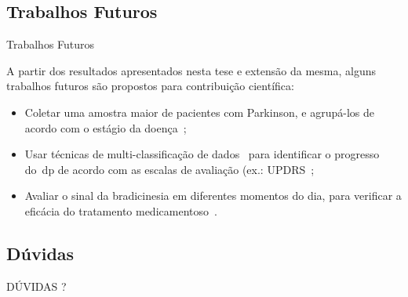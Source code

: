 \documentclass{beamer}
\begin{document}
\subsection{Trabalhos Futuros}
\begin{frame}{Trabalhos Futuros}
\begin{block}{}
A partir dos resultados apresentados nesta tese e extensão da mesma, alguns trabalhos futuros são propostos para contribuição científica:
  \begin{itemize}
   \item Coletar uma amostra maior de pacientes com Parkinson, e agrupá-los de acordo com o estágio da doença~\cite{goul05};
   \item Usar técnicas de multi-classificação de dados~\cite{multisvm2011} para identificar o progresso do~\ac{dp} de acordo com as escalas de avaliação (ex.: UPDRS~\cite{UPDRS};
   \item Avaliar o sinal da bradicinesia em diferentes momentos do dia, para verificar a eficácia do tratamento medicamentoso~\cite{protpar010}.   
  \end{itemize}
\end{block}
\end{frame}


\subsection{Dúvidas}
\begin{frame}
  \begin{center}
  DÚVIDAS ?
  \end{center}
\end{frame}


\end{document}
